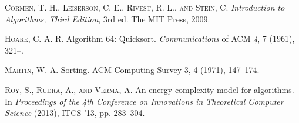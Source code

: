 \documentclass[a4paper, 10pt,twocolumn]{article}
\begin{document}
\begin{thebibliography}{25}
\textsc{Cormen}, T. H., \textsc{Leiserson}, C. E., \textsc{Rivest}, R. L., \textsc{and} \textsc{Stein}, C. \textit{Introduction to Algorithms, Third Edition}, 3rd ed. The MIT Press, 2009.

\textsc{Hoare}, C. A. R. Algorithm 64: Quicksort. \textit{Communications} of ACM \textit{4}, 7 (1961), 321--.

\textsc{Martin}, W. A. Sorting. ACM Computing Survey 3, 4 (1971), 147--174.


 \textsc{Roy}, S., \textsc{Rudra}, A., \textsc{and} \textsc{Verma}, A. An energy complexity model for algorithms. In \textit{Proceedings of the 4th Conference on Innovations in Theoretical Computer Science} (2013), ITCS '13, pp. 283--304.



\end{thebibliography}
\end{document}

